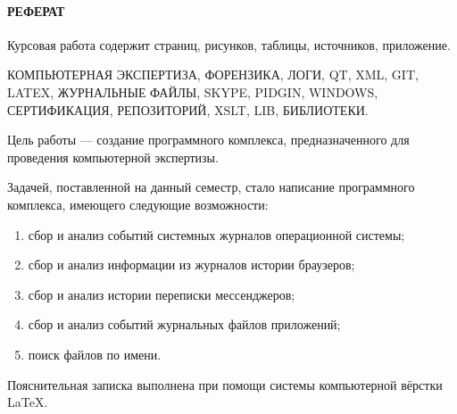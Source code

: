 \newpage
{}
\paragraph{\hfill РЕФЕРАТ \hfill}
Курсовая работа содержит  страниц,  рисунков,  таблицы,  источников,  приложение.

КОМПЬЮТЕРНАЯ ЭКСПЕРТИЗА, ФОРЕНЗИКА, ЛОГИ, QT, XML, GIT, LATEX, ЖУРНАЛЬНЫЕ ФАЙЛЫ, SKYPE, PIDGIN, WINDOWS, СЕРТИФИКАЦИЯ, РЕПОЗИТОРИЙ, XSLT, LIB, БИБЛИОТЕКИ.

Цель работы --- создание программного комплекса, предназначенного для проведения компьютерной экспертизы.

Задачей, поставленной на данный семестр, стало написание программного комплекса, имеющего следующие возможности: 
\begin{enumerate}
\item сбор и анализ событий системных журналов операционной системы;
\item сбор и анализ информации из журналов истории браузеров;
\item сбор и анализ истории переписки мессенджеров;
\item сбор и анализ событий журнальных файлов приложений;
\item поиск файлов по имени.
\end{enumerate}


Пояснительная записка выполнена при помощи системы компьютерной вёрстки \LaTeX.